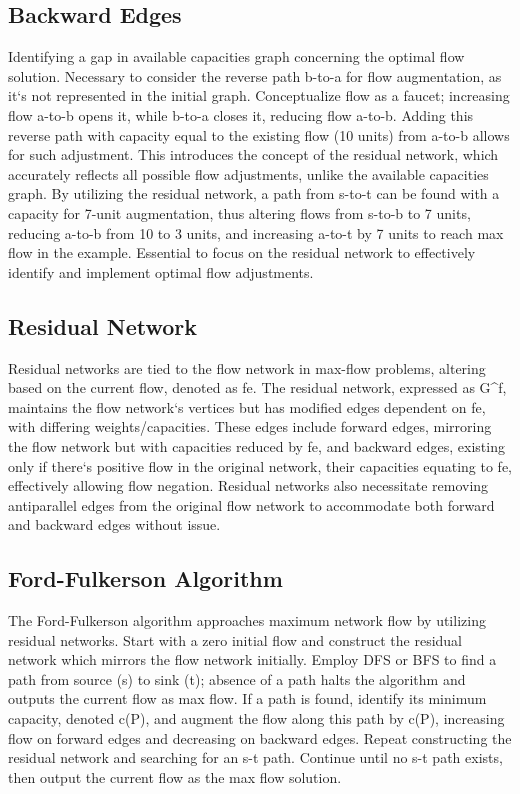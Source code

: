 \subsection*{Backward Edges}
Identifying a gap in available capacities graph concerning the optimal flow solution.
Necessary to consider the reverse path b-to-a for flow augmentation, as it`s not represented in the initial graph.
Conceptualize flow as a faucet; increasing flow a-to-b opens it, while b-to-a closes it, reducing flow a-to-b.
Adding this reverse path with capacity equal to the existing flow (10 units) from a-to-b allows for such adjustment.
This introduces the concept of the residual network, which accurately reflects all possible flow adjustments, unlike the available capacities graph.
By utilizing the residual network, a path from s-to-t can be found with a capacity for 7-unit augmentation, thus altering flows from s-to-b to 7 units, reducing a-to-b from 10 to 3 units, and increasing a-to-t by 7 units to reach max flow in the example.
Essential to focus on the residual network to effectively identify and implement optimal flow adjustments.

\subsection*{Residual Network}
Residual networks are tied to the flow network in max-flow problems, altering based on the current flow, denoted as fe.
The residual network, expressed as G\textasciicircum{}f, maintains the flow network`s vertices but has modified edges dependent on fe, with differing weights/capacities.
These edges include forward edges, mirroring the flow network but with capacities reduced by fe, and backward edges, existing only if there`s positive flow in the original network, their capacities equating to fe, effectively allowing flow negation.
Residual networks also necessitate removing antiparallel edges from the original flow network to accommodate both forward and backward edges without issue.

\subsection*{Ford-Fulkerson Algorithm}
The Ford-Fulkerson algorithm approaches maximum network flow by utilizing residual networks.
Start with a zero initial flow and construct the residual network which mirrors the flow network initially.
Employ DFS or BFS to find a path from source (s) to sink (t); absence of a path halts the algorithm and outputs the current flow as max flow.
If a path is found, identify its minimum capacity, denoted c(P), and augment the flow along this path by c(P), increasing flow on forward edges and decreasing on backward edges.
Repeat constructing the residual network and searching for an s-t path.
Continue until no s-t path exists, then output the current flow as the max flow solution.


